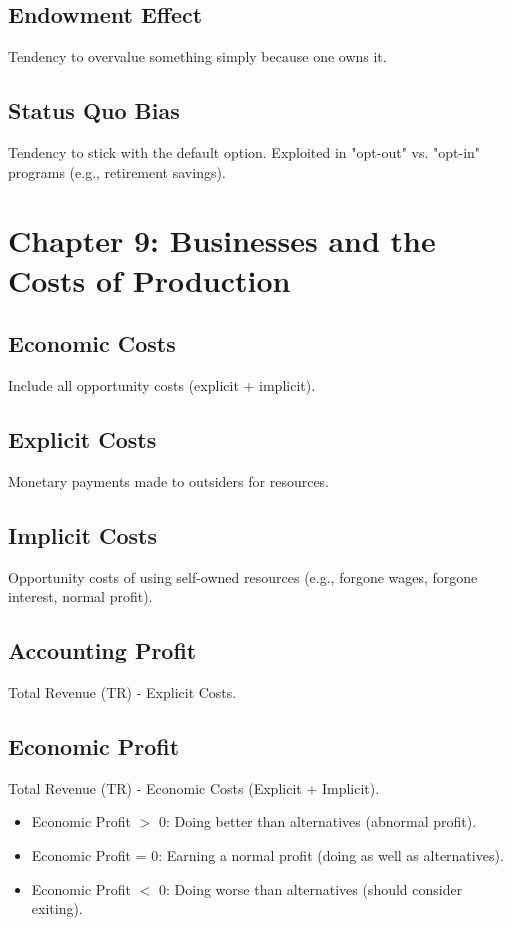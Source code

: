 \documentclass{article}
\begin{document}
\subsection*{Endowment Effect}
Tendency to overvalue something simply because one owns it.

\subsection*{Status Quo Bias}
Tendency to stick with the default option. Exploited in "opt-out" vs. "opt-in" programs (e.g., retirement savings).

\section*{Chapter 9: Businesses and the Costs of Production}

\subsection*{Economic Costs}
Include all opportunity costs (explicit + implicit).

\subsection*{Explicit Costs}
Monetary payments made to outsiders for resources.

\subsection*{Implicit Costs}
Opportunity costs of using self-owned resources (e.g., forgone wages, forgone interest, normal profit).

\subsection*{Accounting Profit}
Total Revenue (TR) - Explicit Costs.

\subsection*{Economic Profit}
Total Revenue (TR) - Economic Costs (Explicit + Implicit).
\begin{itemize}
    \item Economic Profit $>$ 0: Doing better than alternatives (abnormal profit).
    \item Economic Profit = 0: Earning a normal profit (doing as well as alternatives).
    \item Economic Profit $<$ 0: Doing worse than alternatives (should consider exiting).
\end{itemize}
\end{document}
